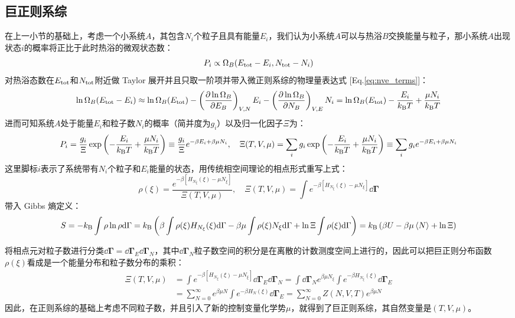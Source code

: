 \newpage
\subsection{巨正则系综}
在上一小节的基础上，考虑一个小系统$A$，其包含$N_i$个粒子且具有能量$E_i$，我们认为小系统$A$可以与热浴$B$交换能量与粒子，那小系统$A$出现状态$i$的概率将正比于此时热浴的微观状态数：
\[P_i\propto \Omega_B(E_{\rm tot}-E_i, N_{\rm tot}-N_i)\]
对热浴态数在$E_{\rm tot}$和$N_{\rm tot}$附近做 Taylor 展开并且只取一阶项并带入微正则系综的物理量表达式 [Eq.\eqref{eq:nve_terms}]：
\[\ln \Omega_B(E_{\rm tot}-E_i)\approx\ln \Omega_B(E_{\rm tot})-\left(\pdv{\ln\Omega_B}{E_B}\right)_{V,N}E_i-\left(\pdv{\ln\Omega_B}{N_B}\right)_{V,E}N_i=\ln \Omega_B(E_{\rm tot})-\frac{E_i}{k_{\rm B} T}+\frac{\mu N_i}{k_{\rm B} T}\]
进而可知系统$A$处于能量$E_i$和粒子数$N_i$的概率（简并度为$g_i$）以及归一化因子$\Xi$为：
\[P_i=\frac{g_i}{\Xi}\exp\left(-\frac{E_i}{k_{\rm B} T}+\frac{\mu N_i}{k_{\rm B} T}\right)\equiv\frac{g_i}{\Xi}e^{-\beta E_i+\beta\mu N_i}, \quad \Xi(T,V,\mu)=\sum_i g_i\exp\left(-\frac{E_i}{k_{\rm B} T}+\frac{\mu N_i}{k_{\rm B} T}\right)\equiv\sum_i g_i e^{-\beta E_i+\beta\mu N_i}\]
这里脚标$i$表示了系统带有$N_i$个粒子和$E_i$能量的状态，用传统相空间理论的相点形式重写上式：
\[\rho(\xi)=\frac{e^{-\beta [H_{N_{\xi}}(\xi)-\mu N_{\xi}]}}{\Xi(T,V,\mu)},\quad \Xi(T,V,\mu)=\int e^{-\beta [H_{N_{\xi}}(\xi)-\mu N_{\xi}]}\dd\bm{\Gamma}\]
带入 Gibbs 熵定义：
\[S=-k_{\rm B}\int \rho\ln\rho\dd\Gamma=k_{\rm B}\left(\beta\int \rho(\xi)H_{N_{\xi}}(\xi)\dd\Gamma-\beta\mu\int \rho(\xi)N_{\xi}\dd\Gamma+\ln \Xi\int \rho(\xi)\dd\Gamma\right)=k_{\rm B}\left(\beta U-\beta\mu \expval{N}+\ln \Xi\right)\]

将相点元对粒子数进行分类$\dd{\bm{\Gamma}}=\dd{\bm{\Gamma}_E}\dd{\bm{\Gamma}_N}$，其中$\dd{\bm{\Gamma}_N}$粒子数空间的积分是在离散的计数测度空间上进行的，因此可以把巨正则分布函数$\rho(\xi)$看成是一个能量分布和粒子数分布的乘积：
\begin{equation}\label{eq:partition_nvmu}
\begin{aligned}
\Xi(T,V,\mu)&=\int e^{-\beta [H_{N_{\xi}}(\xi)-\mu N_{\xi}]}\dd\bm{\Gamma}_E\dd\bm{\Gamma}_N=\int\dd\bm{\Gamma}_N e^{\beta\mu N_{\xi}}\int e^{-\beta H_{N_{\xi}}(\xi)}\dd\bm{\Gamma}_E\\
&=\sum_{N=0}^{\infty}e^{\beta\mu N}\int e^{-\beta H_N(\xi)}\dd\bm{\Gamma}_E=\sum_{N=0}^{\infty}Z(N,V,T)e^{\beta\mu N}
\end{aligned}
\end{equation}
因此，在正则系综的基础上考虑不同粒子数，并且引入了新的控制变量化学势$\mu$，就得到了巨正则系综，其自然变量是$(T,V,\mu)$。

